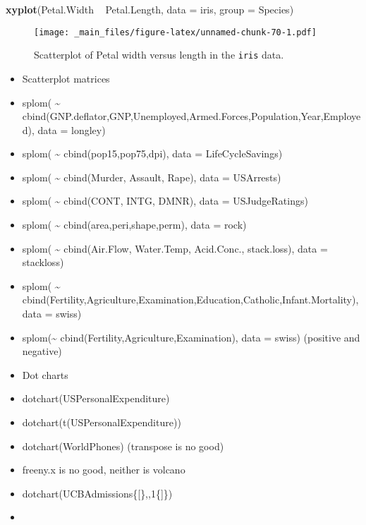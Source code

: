 \documentclass[]{book}
\newenvironment{Shaded}{\begin{snugshade}}{\end{snugshade}}
\newcommand{\KeywordTok}[1]{\textcolor[rgb]{0.13,0.29,0.53}{\textbf{{#1}}}}
\newcommand{\DataTypeTok}[1]{\textcolor[rgb]{0.13,0.29,0.53}{{#1}}}
\newcommand{\StringTok}[1]{\textcolor[rgb]{0.31,0.60,0.02}{{#1}}}
\newcommand{\NormalTok}[1]{{#1}}
\numberwithin{equation}{chapter}
\numberwithin{figure}{chapter}
\theoremstyle{plain}
\theoremstyle{definition}
\theoremstyle{remark}
\theoremstyle{definition}
\theoremstyle{definition}
\theoremstyle{remark}
\begin{document}
\begin{Shaded}
\begin{Highlighting}[]
\KeywordTok{xyplot}\NormalTok{(Petal.Width ~}\StringTok{ }\NormalTok{Petal.Length, }\DataTypeTok{data =} \NormalTok{iris, }\DataTypeTok{group =} \NormalTok{Species)}
\end{Highlighting}
\end{Shaded}

\begin{figure}[htbp]
\centering
\texttt{[image: \_main\_files/figure-latex/unnamed-chunk-70-1.pdf]}
\caption{\label{fig:unnamed-chunk-70}\small Scatterplot of Petal width versus length in the
\texttt{iris} data.}
\end{figure}




\begin{itemize}
\item
  Scatterplot matrices
\item
  splom( \textasciitilde{}
  cbind(GNP.deflator,GNP,Unemployed,Armed.Forces,Population,Year,Employed),
  data = longley)
\item
  splom( \textasciitilde{} cbind(pop15,pop75,dpi), data =
  LifeCycleSavings)
\item
  splom( \textasciitilde{} cbind(Murder, Assault, Rape), data =
  USArrests)
\item
  splom( \textasciitilde{} cbind(CONT, INTG, DMNR), data =
  USJudgeRatings)
\item
  splom( \textasciitilde{} cbind(area,peri,shape,perm), data = rock)
\item
  splom( \textasciitilde{} cbind(Air.Flow, Water.Temp, Acid.Conc.,
  stack.loss), data = stackloss)
\item
  splom( \textasciitilde{}
  cbind(Fertility,Agriculture,Examination,Education,Catholic,Infant.Mortality),
  data = swiss)
\item
  splom(\textasciitilde{} cbind(Fertility,Agriculture,Examination), data
  = swiss) (positive and negative)
\item
  Dot charts
\item
  dotchart(USPersonalExpenditure)
\item
  dotchart(t(USPersonalExpenditure))
\item
  dotchart(WorldPhones) (transpose is no good)
\item
  freeny.x is no good, neither is volcano
\item
  dotchart(UCBAdmissions\{{[}\},,1\{{]}\})
\item

\end{itemize}
\end{document}

